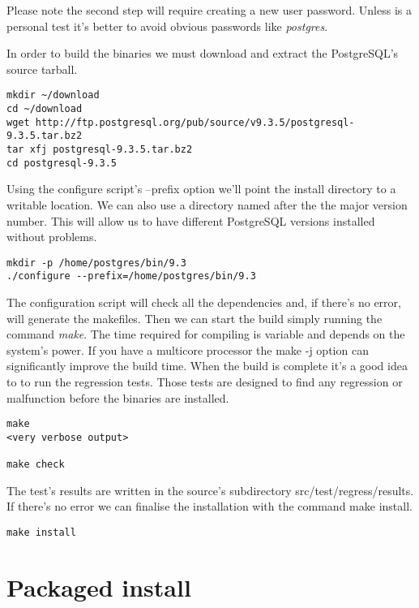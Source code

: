 Please note the second step will require creating a new user password. Unless is a personal
test it's better to avoid obvious passwords like \textit{postgres}.\newline

In order to build the binaries we must download and extract the PostgreSQL's source tarball.

\begin{verbatim}
mkdir ~/download
cd ~/download
wget http://ftp.postgresql.org/pub/source/v9.3.5/postgresql-9.3.5.tar.bz2
tar xfj postgresql-9.3.5.tar.bz2
cd postgresql-9.3.5
\end{verbatim}


Using the configure script's --prefix option we'll point the install directory to a writable
location. We can also use a directory named after the the major version number. This will allow
us to have different PostgreSQL versions installed without problems.

\begin{verbatim}
mkdir -p /home/postgres/bin/9.3
./configure --prefix=/home/postgres/bin/9.3
\end{verbatim}

The configuration script will check all the dependencies and, if there's no error, will generate 
the makefiles. Then we can start the build simply running the command \textit{make}. The time
required for compiling is variable and depends on the system's power. If you have a multicore
processor the make -j option can significantly improve the build time. When the build is complete
it's a good idea to to run the regression tests. Those tests are designed to find any regression or
malfunction before the binaries are installed.

\begin{verbatim}
make
<very verbose output>

make check 

\end{verbatim}

The test's results are written in the source's subdirectory src/test/regress/results. If
there's no error we can finalise the installation with the command make install.

\begin{verbatim}
make install
\end{verbatim}



\section{Packaged install}
\label{sec:DEBIAN_INSTALL}

